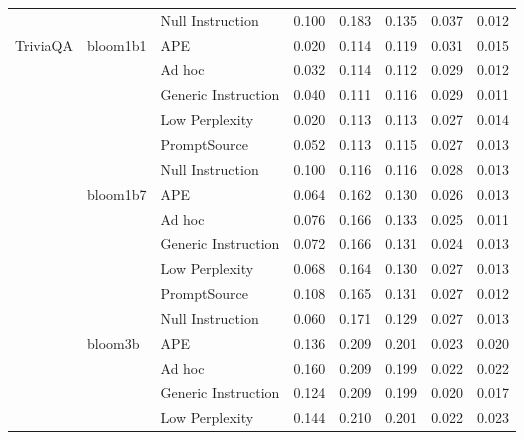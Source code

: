\begin{supertabular}{lllrrrrr}
              &        & Null Instruction &            0.100 &           0.183 &          0.135 &        0.037 &    0.012 \\
TriviaQA & bloom1b1 & APE &            0.020 &           0.114 &          0.119 &        0.031 &    0.015 \\
              &        & Ad hoc &            0.032 &           0.114 &          0.112 &        0.029 &    0.012 \\
              &        & Generic Instruction &            0.040 &           0.111 &          0.116 &        0.029 &    0.011 \\
              &        & Low Perplexity &            0.020 &           0.113 &          0.113 &        0.027 &    0.014 \\
              &        & PromptSource &            0.052 &           0.113 &          0.115 &        0.027 &    0.013 \\
              &        & Null Instruction &            0.100 &           0.116 &          0.116 &        0.028 &    0.013 \\
              & bloom1b7 & APE &            0.064 &           0.162 &          0.130 &        0.026 &    0.013 \\
              &        & Ad hoc &            0.076 &           0.166 &          0.133 &        0.025 &    0.011 \\
              &        & Generic Instruction &            0.072 &           0.166 &          0.131 &        0.024 &    0.013 \\
              &        & Low Perplexity &            0.068 &           0.164 &          0.130 &        0.027 &    0.013 \\
              &        & PromptSource &            0.108 &           0.165 &          0.131 &        0.027 &    0.012 \\
              &        & Null Instruction &            0.060 &           0.171 &          0.129 &        0.027 &    0.013 \\
              & bloom3b & APE &            0.136 &           0.209 &          0.201 &        0.023 &    0.020 \\
              &        & Ad hoc &            0.160 &           0.209 &          0.199 &        0.022 &    0.022 \\
              &        & Generic Instruction &            0.124 &           0.209 &          0.199 &        0.020 &    0.017 \\
              &        & Low Perplexity &            0.144 &           0.210 &          0.201 &        0.022 &    0.023 \\

\end{supertabular}
